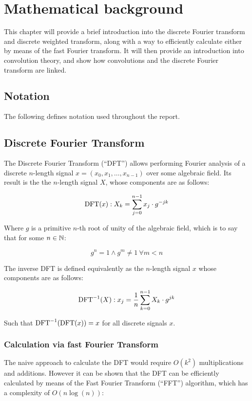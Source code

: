 \chapter{Mathematical background}
\label{chapter:mathematical_background}

This chapter will provide a brief introduction into the discrete Fourier
transform and discrete weighted transform, along with a way to efficiently
calculate either by means of the fast Fourier transform. It will then provide
an introduction into convolution theory, and show how convolutions and the
discrete Fourier transform are linked.

\section{Notation}

The following defines notation used throughout the report.

\section{Discrete Fourier Transform}

The Discrete Fourier Transform (``DFT'') allows performing Fourier analysis of
a discrete $n$-length signal $x = (x_0, x_1, \ldots, x_{n-1})$ over some
algebraic field. Its result is the the $n$-length signal $X$, whose components
are as follows:\autocite{crandallPrimeNumbersComputational2005}

\[
		\operatorname{DFT}(x) : X_k = \sum_{j=0}^{n-1} x_j \cdot g^{-jk}
\]

Where $g$ is a primitive $n$-th root of unity of the algebraic field, which is
to say that for some $n \in \mathbb{N}$:

\[
		g^n = 1 \land g^m \neq 1\ \forall m < n
\]

The inverse DFT is defined equivalently as the $n$-length signal $x$ whose
components are as follows:

\[
		\operatorname{DFT}^{-1}(X) : x_j = \frac{1}{n} \sum_{k=0}^{n-1} X_k \cdot g^{jk}
\]

Such that $\operatorname{DFT}^{-1}(\operatorname{DFT}(x)) = x$ for all discrete signals $x$.

\subsection{Calculation via fast Fourier Transform}

The naive approach to calculate the DFT would require $O(k^2)$ multiplications
and additions. However it can be shown that the DFT can be efficiently
calculated by means of the Fast Fourier Transform (``FFT'') algorithm, which
has a complexity of $O(n \log(n))$:\autocite{crandallPrimeNumbersComputational2005}


